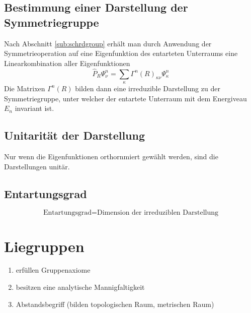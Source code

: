 \documentclass[
  captions=tableheading,  %
  titlepage=firstiscover, %
]{scrartcl}
\begin{document}
\subsection{Bestimmung einer Darstellung der Symmetriegruppe}
Nach Abschnitt \ref{sub:schrdgroup} erhält man durch Anwendung der Symmetrieoperation auf eine 
Eigenfunktion des entarteten Unterraums eine Linearkombination aller Eigenfunktionen
\begin{equation*}
  \hat{P}_R \Psi_\nu^n = \sum_\kappa \Gamma^n(R)_{\kappa \nu} \Psi_\kappa^n
\end{equation*}
Die Matrixen $\Gamma^n(R)$ bilden dann eine irreduzible Darstellung zu der Symmetriegruppe, unter welcher 
der entartete Unterraum mit dem Energiveau $E_n$ invariant ist.
\subsection{Unitarität der Darstellung}
Nur wenn die Eigenfunktionen orthornmiert gewählt werden, sind die Darstellungen unitär.
\subsection{Entartungsgrad}
\begin{equation*}
  \text{Entartungsgrad} = \text{Dimension der irreduziblen Darstellung}
\end{equation*}
\section{Liegruppen}
\begin{enumerate}
\item erfüllen Gruppenaxiome 
\item besitzen eine analytische Mannigfaltigkeit
\item Abstandsbegriff (bilden topologischen Raum, metrischen Raum)
\end{enumerate}
\end{document}
